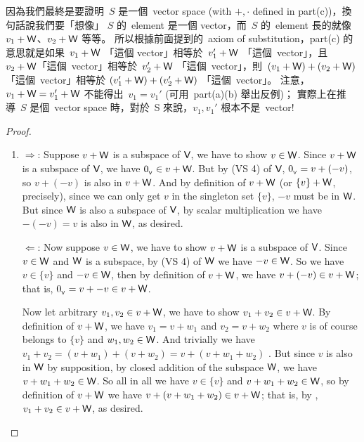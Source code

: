 \begin{note}
因為我們最終是要證明\ \(S\) 是一個\ vector space (with \(+, \cdot\) defined in part(c))，換句話說我們要「想像」 \(S\) 的\ element 是一個 vector，而\ \(S\) 的\ element 長的就像\ \(v_1 + \textsf{W}\)、\(v_2 + \textsf{W}\) 等等。
所以根據前面提到的\ axiom of substitution，part(c) 的意思就是如果\ \(v_1 + \textsf{W}\) 「這個 vector」相等於\ \(v_1' + \textsf{W}\) 「這個\ vector」，且\ \(v_2 + \textsf{W}\)「這個\ vector」相等於\ \(v_2' + \textsf{W}\) 「這個\ vector」，則\ \((v_1 + \textsf{W}) + (v_2 + \textsf{W})\)「這個\ vector」相等於 \((v_1' + \textsf{W}) + (v_2' + \textsf{W})\) 「這個\ vector」。
注意，\(v_1 + \textsf{W} = v_1' + \textsf{W}\) 不能得出\ \(v_1 = v_1'\) (可用\ part(a)(b) 舉出反例)；
實際上在推導\ \(S\) 是個\ vector space 時，對於\ S 來說，\(v_1, v_1'\) 根本不是\ vector!
\end{note}

\begin{proof}\ 

\begin{enumerate}
\item
\(\Longrightarrow\): Suppose \(v + \textsf{W}\) is a subspace of \(\textsf{V}\), we have to show \(v \in \textsf{W}\).
Since \(v + \textsf{W}\) is a subspace of \(\textsf{V}\), we have \(0_{_{\textsf{V}}} \in v + \textsf{W}\).
But by (VS 4) of \(\textsf{V}\), \(0_{_{\textsf{V}}} = v + (-v)\), so \(v + (-v)\) is also in \(v + \textsf{W}\).
And by definition of \(v + \textsf{W}\) (or \(\{ v \} + \textsf{W}\), precisely), since we can only get \(v\) in the singleton set \(\{ v \}\), \(-v\) must be in \(\textsf{W}\).
But since \(\textsf{W}\) is also a subspace of \(\textsf{V}\), by scalar multiplication we have \(-(-v) = v\) is also in \(\textsf{W}\), as desired.

\(\Longleftarrow\): Now suppose \(v \in \textsf{W}\), we have to show \(v + \textsf{W}\) is a subspace of \(\textsf{V}\).
Since \(v \in \textsf{W}\) and \(\textsf{W}\) is a subspace, by (VS 4) of \(\textsf{W}\) we have \(-v \in \textsf{W}\).
So we have \(v \in \{ v \}\) and \(-v \in \textsf{W}\), then by definition of \(v + \textsf{W}\), we have \(v + (-v) \in v + \textsf{W}\);
that is, \(0_{_{\textsf{V}}} = v + -v \in v + \textsf{W}\).

Now let arbitrary \(v_1, v_2 \in v + \textsf{W}\), we have to show \(v_1 + v_2 \in v + \textsf{W}\).
By definition of \(v + \textsf{W}\), we have \(v_1 = v + w_1\) and \(v_2 = v + w_2\) where \(v\) is of course belongs to \(\{ v \}\) and \(w_1, w_2 \in \textsf{W}\).
And trivially we have \(v_1 + v_2 = (v + w_1) + (v + w_2) = v + (v + w_1 + w_2)\) .
But since \(v\) is also in \(\textsf{W}\) by supposition, by closed addition of the subspace \(\textsf{W}\), we have \(v + w_1 + w_2 \in \textsf{W}\).
So all in all we have \(v \in \{ v \}\) and \(v + w_1 + w_2 \in \textsf{W}\), so by definition of \(v + \textsf{W}\) we have \(v + (v + w_1 + w_2) \in v + \textsf{W}\);
that is, by , \(v_1 + v_2 \in v + \textsf{W}\), as desired.


\end{enumerate}
\end{proof}
